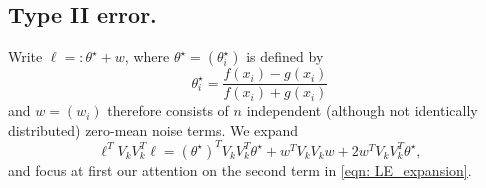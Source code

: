 \documentclass{article}
\newcommand{\1}{\mathbb{I}}
\newcommand{\thetast}{\theta^{\star}}
\theoremstyle{alden}
\theoremstyle{aldenthm}
\theoremstyle{definition}
\theoremstyle{remark}
\begin{document}
\subsection{Type II error.}

Write $\ell =: \thetast + w$, where $\thetast = (\thetast_i)$ is defined by
\begin{equation*}
\thetast_i = \frac{f(x_i) - g(x_i)}{f(x_i) + g(x_i)}
\end{equation*}
and $w = (w_i)$ therefore consists of $n$ independent (although not identically distributed) zero-mean noise terms. We expand
\begin{equation}
\label{eqn: LE_expansion}
\ell^T V_k V_k^T \ell = (\thetast)^T V_k V_k^T \thetast + w^T V_k V_k w + 2 w^T V_k V_k^T \thetast,
\end{equation}
and focus at first our attention on the second term in \eqref{eqn: LE_expansion}.
\end{document}
